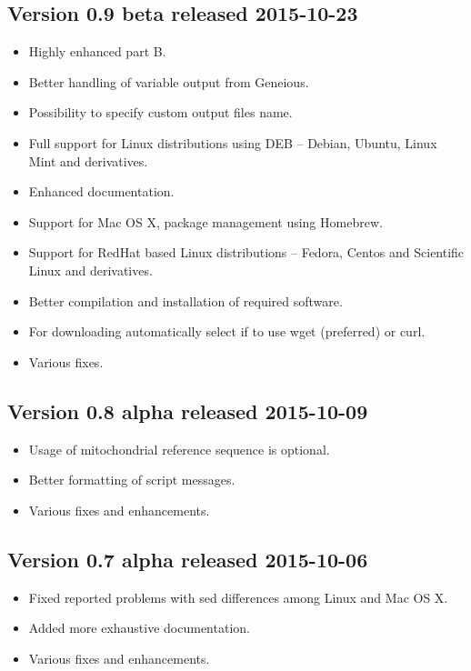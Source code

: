 \documentclass[a4paper, 11pt, twoside]{article}
\begin{document}
\subsection{Version 0.9 beta released 2015-10-23}

\begin{itemize}
  \item Highly enhanced part B.
  \item Better handling of variable output from Geneious.
  \item Possibility to specify custom output files name.
  \item Full support for Linux distributions using DEB -- Debian, Ubuntu, Linux Mint and derivatives.
  \item Enhanced documentation.
  \item Support for Mac OS X, package management using Homebrew.
  \item Support for RedHat based Linux distributions -- Fedora, Centos and Scientific Linux and derivatives.
  \item Better compilation and installation of required software.
  \item For downloading automatically select if to use wget (preferred) or curl.
  \item Various fixes.
\end{itemize}

\subsection{Version 0.8 alpha released 2015-10-09}

\begin{itemize}
  \item Usage of mitochondrial reference sequence is optional.
  \item Better formatting of script messages.
  \item Various fixes and enhancements.
\end{itemize}

\subsection{Version 0.7 alpha released 2015-10-06}

\begin{itemize}
  \item Fixed reported problems with sed differences among Linux and Mac OS X.
  \item Added more exhaustive documentation.
  \item Various fixes and enhancements.
\end{itemize}
\end{document}
